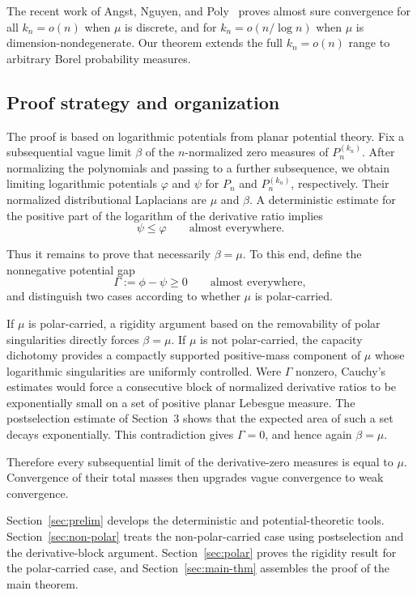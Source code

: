 \documentclass[10pt,reqno]{amsart}
\theoremstyle{remark}
\begin{document}
The recent work of Angst, Nguyen, and Poly~\cite{ANP26} proves almost sure convergence for all $k_n=o(n)$ when $\mu$ is discrete, and for $k_n=o(n/\log n)$ when $\mu$ is dimension-nondegenerate. Our theorem extends the full \(k_n=o(n)\) range to arbitrary Borel probability measures.

\subsection{Proof strategy and organization}
The proof is based on logarithmic potentials from planar potential theory. Fix a subsequential vague limit $\beta$ of the $n$-normalized zero measures of $P_n^{(k_n)}$. After normalizing the polynomials and passing to a further subsequence, we obtain limiting logarithmic potentials $\varphi$ and $\psi$ for $P_n$ and $P_n^{(k_n)}$, respectively. Their normalized distributional Laplacians are $\mu$ and $\beta$. A deterministic estimate for the positive part of the logarithm of the derivative ratio implies
\[\psi\leq\varphi\qquad\text{almost everywhere}.\]

Thus it remains to prove that necessarily \(\beta=\mu\). To this end, define the nonnegative potential gap
\[\Gamma:=\phi-\psi\geq 0\qquad\text{almost everywhere},\]
and distinguish two cases according to whether \(\mu\) is polar-carried.

If $\mu$ is polar-carried, a rigidity argument based on the removability of polar singularities directly forces $\beta=\mu$. If $\mu$ is not polar-carried, the capacity dichotomy provides a compactly supported positive-mass component of $\mu$ whose logarithmic singularities are uniformly controlled. Were $\Gamma$ nonzero, Cauchy's estimates would force a consecutive block of normalized derivative ratios to be exponentially small on a set of positive planar Lebesgue measure. The postselection estimate of Section~3 shows that the expected area of such a set decays exponentially. This contradiction gives $\Gamma=0$, and hence again $\beta=\mu$.

Therefore every subsequential limit of the derivative-zero measures is equal to $\mu$. Convergence of their total masses then upgrades vague convergence to weak convergence.

Section~\ref{sec:prelim} develops the deterministic and potential-theoretic tools. Section~\ref{sec:non-polar} treats the non-polar-carried case using postselection and the derivative-block argument. Section~\ref{sec:polar} proves the rigidity result for the polar-carried case, and Section~\ref{sec:main-thm} assembles the proof of the main theorem.
\end{document}
